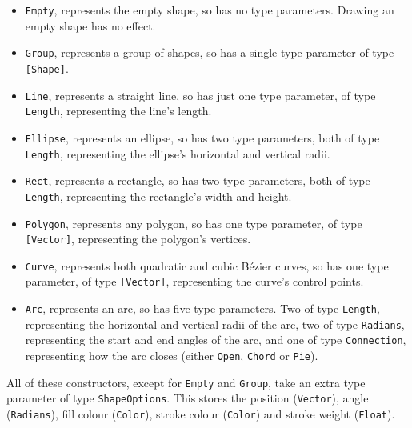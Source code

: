 \documentclass[../main.tex]{subfiles}
\begin{document}
                \begin{itemize}
                    \item \verb|Empty|, represents the empty shape, so has no type parameters.
                          Drawing an empty shape has no effect.
                    \item \verb|Group|, represents a group of shapes, so has a single type
                          parameter of type \verb|[Shape]|.
                    \item \verb|Line|, represents a straight line, so has just one type
                          parameter, of type \verb|Length|, representing the line's length.
                    \item \verb|Ellipse|, represents an ellipse, so has two type parameters, both of
                          type \verb|Length|, representing the ellipse's horizontal and vertical radii.
                    \item \verb|Rect|, represents a rectangle, so has two type parameters, both of type
                          \verb|Length|, representing the rectangle's width and height.
                    \item \verb|Polygon|, represents any polygon, so has one type parameter, of type
                          \verb|[Vector]|, representing the polygon's vertices.
                    \item \verb|Curve|, represents both quadratic and cubic Bézier curves, so has
                          one type parameter, of type \verb|[Vector]|, representing the curve's control
                          points.
                    \item \verb|Arc|, represents an arc, so has five type parameters.
                          Two of type \verb|Length|, representing the horizontal and vertical radii of
                              the arc, two of type \verb|Radians|, representing the start and end angles of
                              the arc, and one of type \verb|Connection|, representing how the arc closes
                              (either \verb|Open|, \verb|Chord| or \verb|Pie|).
                \end{itemize}

                All of these constructors, except for \verb|Empty| and \verb|Group|, take an
                    extra type parameter of type \verb|ShapeOptions|.
                This stores the position (\verb|Vector|), angle (\verb|Radians|), fill colour
                    (\verb|Color|), stroke colour (\verb|Color|) and stroke weight (\verb|Float|).
\end{document}
